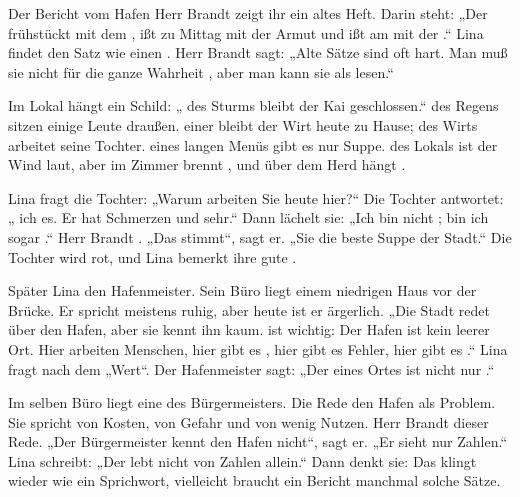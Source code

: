 \documentclass[12pt]{nextbook}
\begin{document}
\begin{readersection}{Der Bericht vom Hafen}
Herr Brandt zeigt ihr ein altes Heft. Darin steht: „Der  frühstückt mit dem , ißt zu Mittag mit der Armut und ißt am  mit der .“ Lina findet den Satz  wie einen . Herr Brandt sagt: „Alte Sätze sind oft hart. Man muß sie nicht für die ganze Wahrheit , aber man kann sie als  lesen.“

Im Lokal hängt ein Schild: „ des Sturms bleibt der Kai geschlossen.“  des Regens sitzen einige Leute draußen.  einer  bleibt der Wirt heute zu Hause;  des Wirts arbeitet seine Tochter.  eines langen Menüs gibt es nur Suppe.  des Lokals ist der Wind laut, aber im Zimmer brennt , und über dem Herd hängt .

Lina fragt die Tochter: „Warum arbeiten Sie heute hier?“ Die Tochter antwortet: „  ich es. Er hat Schmerzen und  sehr.“ Dann lächelt sie: „Ich bin nicht ;  bin ich sogar .“ Herr Brandt . „Das stimmt“, sagt er. „Sie  die beste Suppe der Stadt.“ Die Tochter wird rot, und Lina bemerkt ihre gute .

Später  Lina den Hafenmeister. Sein Büro liegt  einem niedrigen Haus vor der Brücke. Er spricht meistens ruhig, aber heute ist er ärgerlich. „Die Stadt redet über den Hafen, aber sie kennt ihn kaum.  ist wichtig: Der Hafen ist kein leerer Ort. Hier arbeiten Menschen, hier gibt es , hier gibt es Fehler, hier gibt es .“ Lina fragt nach dem  „Wert“. Der Hafenmeister sagt: „Der  eines Ortes ist nicht nur .“

Im selben Büro liegt eine  des Bürgermeisters. Die Rede  den Hafen als Problem. Sie spricht von Kosten, von Gefahr und von wenig Nutzen. Herr Brandt  dieser Rede. „Der Bürgermeister kennt den Hafen nicht“, sagt er. „Er sieht nur Zahlen.“ Lina schreibt: „Der  lebt nicht von Zahlen allein.“ Dann denkt sie: Das klingt wieder wie ein Sprichwort,  vielleicht braucht ein Bericht manchmal solche Sätze.


\end{readersection}
\end{document}
